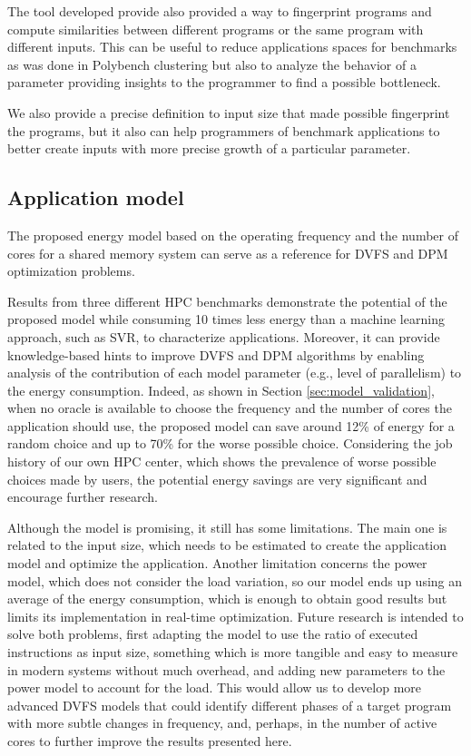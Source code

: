 The tool developed provide also provided a way to fingerprint programs and compute similarities between different programs or the same program with different inputs. This can be useful to reduce applications spaces for benchmarks as was done in Polybench clustering but also to analyze the behavior of a parameter providing insights to the programmer to find a possible bottleneck.

We also provide a precise definition to input size that made possible fingerprint the programs, but it also can help programmers of benchmark applications to better create inputs with more precise growth of a particular parameter.

\subsection{Application model} \label{sec:conclusion_models}
The proposed energy model based on the operating frequency and the number of cores for a shared memory system can serve as a reference for DVFS and DPM optimization problems.

Results from three different HPC benchmarks demonstrate the potential of the proposed model while consuming 10 times less energy than a machine learning approach, such as SVR, to characterize applications. Moreover, it can provide knowledge-based hints to improve DVFS and DPM algorithms by enabling analysis of the contribution of each model parameter (e.g., level of parallelism) to the energy consumption. Indeed, as shown in Section \ref{sec:model_validation}, when no oracle is available to choose the frequency and the number of cores the application should use, the proposed model can save around 12\% of energy for a random choice and up to 70\% for the worse possible choice. Considering the job history of our own HPC center, which shows the prevalence of worse possible choices made by users, the potential energy savings are very significant and encourage further research.

Although the model is promising, it still has some limitations. The main one is related to the input size, which needs to be estimated to create the application model and optimize the application. Another limitation concerns the power model, which does not consider the load variation, so our model ends up using an average of the energy consumption, which is enough to obtain good results but limits its implementation in real-time optimization.
Future research is intended to solve both problems, first adapting the model to use the ratio of executed instructions as input size, something which is more tangible and easy to measure in modern systems without much overhead, and adding  new parameters to the power model to account for the load. This would allow us to develop more advanced DVFS models that could identify different phases of a target program with more subtle changes in frequency, and, perhaps, in the number of active cores to  further improve the results presented here.

